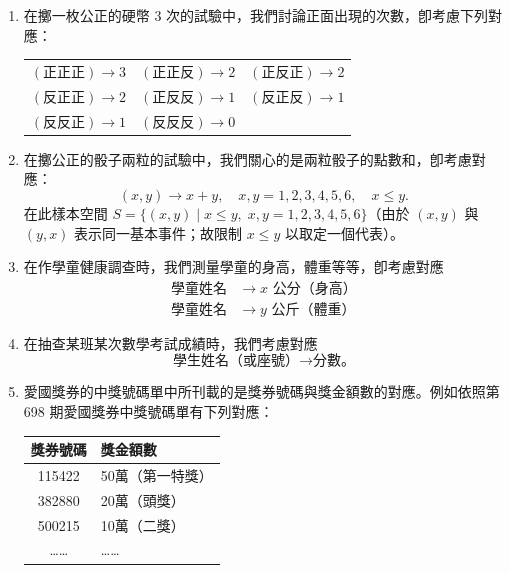 \begin{enumerate}[label=\textbf{\arabic*.}]
  \item 在擲一枚公正的硬幣 3 次的試驗中，我們討論正面出現的次數，卽考慮下列對應：
  \begin{center}
  \renewcommand{\arraystretch}{1.2}
  \begin{tabular}{ccc}
  $(\text{正正正}) \longrightarrow 3$ & $(\text{正正反}) \longrightarrow 2$ & $(\text{正反正}) \longrightarrow 2$ \\
  $(\text{反正正}) \longrightarrow 2$ & $(\text{正反反}) \longrightarrow 1$ & $(\text{反正反}) \longrightarrow 1$ \\
  $(\text{反反正}) \longrightarrow 1$ & $(\text{反反反}) \longrightarrow 0$ &
  \end{tabular}
  \end{center}

  \item 在擲公正的骰子兩粒的試驗中，我們關心的是兩粒骰子的點數和，卽考慮對應：
  \[
  (x, y) \longrightarrow x + y, \quad x, y = 1, 2, 3, 4, 5, 6, \quad x \le y.
  \]
  在此樣本空間 $S = \{(x, y) \mid x \le y, \; x, y = 1, 2, 3, 4, 5, 6\}$（由於 $(x, y)$ 與 $(y, x)$ 表示同一基本事件；故限制 $x \le y$ 以取定一個代表）。

  \item 在作學童健康調查時，我們測量學童的身高，體重等等，卽考慮對應
  \begin{align*}
  \text{學童姓名} &\longrightarrow x\text{ 公分（身高）} \\
  \text{學童姓名} &\longrightarrow y\text{ 公斤（體重）}
  \end{align*}

  \item 在抽查某班某次數學考試成績時，我們考慮對應
  \[
  \text{學生姓名（或座號）} \longrightarrow \text{分數。}
  \]

  \item 愛國獎券的中獎號碼單中所刊載的是獎券號碼與獎金額數的對應。例如依照第 698 期愛國獎券中獎號碼單有下列對應：
  \begin{center}
  \renewcommand{\arraystretch}{1.2}
  \begin{tabular}{c|l}
  獎券號碼 & \quad 獎金額數 \\ \hline
  115422 & 50萬（第一特獎） \\
  382880 & 20萬（頭獎） \\
  500215 & 10萬（二獎） \\
  \dots\dots & \quad \dots\dots
  \end{tabular}
  \end{center}
\end{enumerate}

